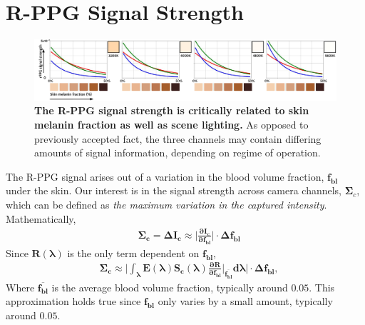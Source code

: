 \section{R-PPG Signal Strength} 

\begin{figure}[t]
    \centering
    \includegraphics[width=\linewidth]{include/fig_strength.pdf}
    \caption{\textbf{The R-PPG signal strength is critically related to skin melanin fraction as well as scene lighting.} As opposed to previously accepted fact, the three channels may contain differing amounts of signal information, depending on regime of operation.}
    \label{fig:signal_strength}
\end{figure}

The R-PPG signal arises out of a variation in the blood volume fraction, $\mathbf{f_{bl}}$ under the skin. Our interest is in the signal strength across camera channels, $\boldsymbol\Sigma_{c}$, which can be defined as \textit{the maximum variation in the captured intensity}. Mathematically,
\begin{equation}
\begin{split}
    &\mathbf{\boldsymbol\Sigma_{c}=\boldsymbol\Delta I_c\boldsymbol\approx \Big|\frac{\boldsymbol\partial I_c}{\boldsymbol\partial f_{bl}}\Big|\cdot\boldsymbol\Delta f_{bl}}
\end{split}
\end{equation}
Since $\mathbf{R(\boldsymbol\lambda)}$ is the only term dependent on $\mathbf{f_{bl}}$,
\begin{equation}
\begin{split}
    &\mathbf{\boldsymbol\Sigma_{c}\boldsymbol\approx  \Big|\boldsymbol\int_{\boldsymbol\lambda}E(\boldsymbol\lambda)S_{c}(\boldsymbol\lambda)\frac{\boldsymbol\partial R}{\boldsymbol\partial f_{bl}}\Bigg|_{\overline{f_{bl}}} d\boldsymbol\lambda \Big| \cdot \boldsymbol\Delta f_{bl}},
\end{split}
\end{equation}
Where $\mathbf{\overline{f_{bl}}}$ is the average blood volume fraction, typically around $0.05$. This approximation holds true since $\mathbf{f_{bl}}$ only varies by a small amount, typically around $0.05$. 

